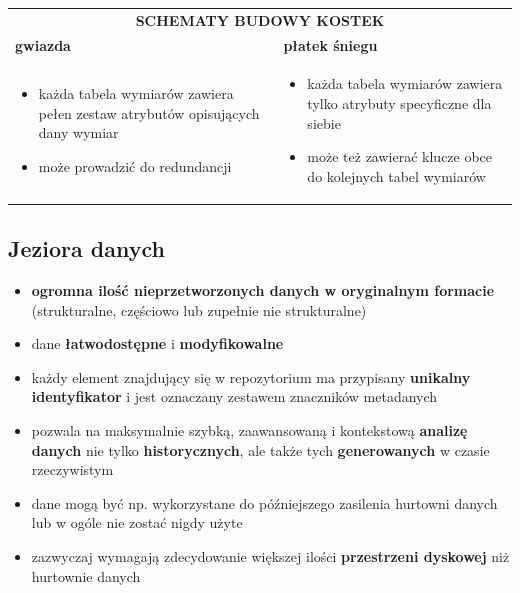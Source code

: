 \documentclass[a4paper]{article}
\begin{document}
    \begin{table}[H]
        \begin{center}
            \begin{tabular}{p{8cm} p{8cm}}
                \multicolumn{2}{c}{\textbf{SCHEMATY BUDOWY KOSTEK}}\\
                \textbf{gwiazda} & \textbf{płatek śniegu}\\
                \begin{itemize}
                    \item każda tabela wymiarów zawiera pełen zestaw atrybutów opisujących dany wymiar
                    \item może prowadzić do redundancji
                \end{itemize}
                &
                \begin{itemize}
                    \item każda tabela wymiarów zawiera tylko atrybuty specyficzne dla siebie
                    \item może też zawierać klucze obce do kolejnych tabel wymiarów
                \end{itemize}
            \end{tabular}
        \end{center}
    \end{table}

    \subsection{Jeziora danych}
    \begin{itemize}
        \item \textbf{ogromna ilość nieprzetworzonych danych w oryginalnym formacie} (strukturalne, częściowo lub zupełnie nie strukturalne)
        \item dane \textbf{łatwodostępne} i \textbf{modyfikowalne}
        \item każdy element znajdujący się w repozytorium ma przypisany
        \textbf{unikalny identyfikator} i jest oznaczany zestawem znaczników metadanych
        \item pozwala na maksymalnie szybką, zaawansowaną i kontekstową \textbf{analizę danych} nie tylko \textbf{historycznych}, ale
        także tych \textbf{generowanych} w czasie rzeczywistym
        \item dane mogą być np. wykorzystane do późniejszego zasilenia hurtowni danych lub w ogóle nie zostać nigdy użyte
        \item zazwyczaj wymagają zdecydowanie większej ilości \textbf{przestrzeni dyskowej} niż hurtownie danych
    \end{itemize}
\end{document}
